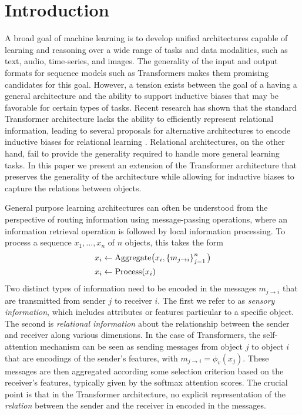 \section{Introduction}\label{sec:intro}

A broad goal of machine learning is to develop unified architectures 
capable of learning and reasoning over a wide range of tasks and data modalities, such as text, audio, time-series, and images. The generality of the input and output formats for sequence models such as Transformers makes them promising candidates for this goal. However,
a tension exists between the goal of a having a general architecture and 
the ability to support inductive biases that may be favorable for certain types of 
tasks. Recent research has shown that the 
standard Transformer architecture lacks the ability to efficiently
represent relational information, leading to several proposals 
for alternative architectures to encode inductive biases for relational learning 
\citep{santoroRelationalRecurrentNeural2018,shanahanExplicitlyRelationalNeurala,webbEmergentSymbolsBinding2021,kergNeuralArchitectureInductive2022,altabaaLearningHierarchicalRelational2024a,altabaaAbstractorsRelationalCrossattention2023a,webbRelationalBottleneckInductive2024}. Relational architectures, on the other hand, 
fail to provide the generality required to handle more general learning tasks.
In this paper we present an extension of the Transformer architecture that preserves 
the generality of the architecture while allowing for inductive biases to capture the relations between objects. 

General purpose learning architectures can often be understood from the perspective of routing information using message-passing operations, 
where an information retrieval operation is followed by local information processing.
To process a sequence $x_1,\ldots, x_n$ of $n$ objects, this takes the form
\begin{equation}\label{eq:intro_message_passing}
  \begin{split}
    x_i &\gets \mathrm{Aggregate}\big(x_i, \left\{m_{j \to i}\right\}_{j=1}^{n}\big) \\
    x_i &\gets \mathrm{Process}(x_i)
  \end{split}
\end{equation}
Two distinct types of information need to be encoded in the messages $m_{j \to i}$ that
are transmitted from sender $j$ to receiver $i$. The first we refer to 
as \textit{sensory information}, which includes attributes or features 
particular to a specific object.  The second is \textit{relational information} 
about the relationship between the sender and receiver along various dimensions. 
In the case of Transformers, the self-attention mechanism can be
seen as sending messages from object $j$ to object $i$ that are encodings of the sender's features, with $m_{j \to i} = \phi_v(x_j)$. These messages 
are then aggregated according some selection criterion based on the receiver's features,  typically given by the softmax attention scores. The crucial point is that in the Transformer architecture, no explicit representation of the \textit{relation} between the sender and the receiver in encoded in the messages.

